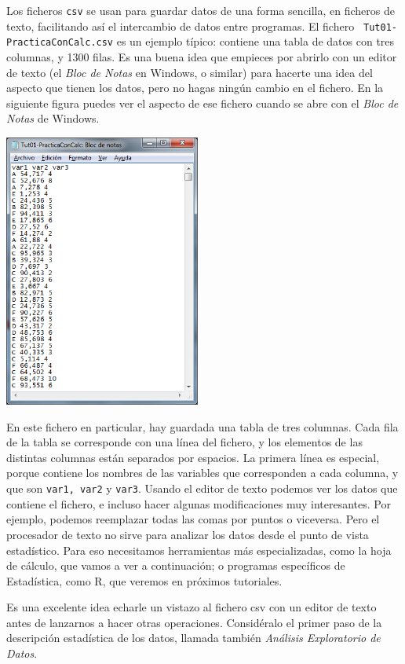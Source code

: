 \documentclass[10pt,a4paper]{article}\usepackage[]{graphicx}\usepackage[]{color}
\newcounter {cont01}
\begin{document}
Los ficheros {\tt csv} se usan para guardar datos de una forma sencilla, en ficheros de texto,
facilitando así el intercambio de datos entre programas. El fichero  {\tt
Tut01-PracticaConCalc.csv} es un ejemplo típico: contiene una tabla de datos con tres columnas, y
1300 filas. Es una buena idea que empieces por abrirlo con un editor de texto (el {\em Bloc de
Notas} en Windows, o similar) para hacerte una idea del aspecto que tienen los datos, pero no hagas
ningún cambio en el fichero. En la siguiente figura puedes ver el aspecto de ese fichero cuando se
abre con el  {\em Bloc de Notas} de Windows.
    \begin{center}
    \includegraphics[height=9cm]{../fig/Tut00-AbriendoFicheroCsvBlocDeNotas.png}
    \end{center}
En este fichero en particular, hay guardada una tabla de tres columnas. Cada fila de la tabla se
corresponde con una línea del fichero, y los elementos de las distintas columnas están separados
por espacios. La primera línea es especial, porque contiene los nombres de las variables que
corresponden a cada columna, y que son {\tt var1, var2} y {\tt var3}. Usando el editor de texto
podemos ver los datos que contiene el fichero, e incluso hacer algunas modificaciones muy
interesantes. Por ejemplo, podemos reemplazar todas las comas por puntos o viceversa. Pero el
procesador de texto no sirve para analizar los datos desde el punto de vista estadístico. Para eso
necesitamos herramientas más especializadas, como la hoja de cálculo, que vamos a ver a
continuación; o programas específicos de Estadística, como R, que veremos en próximos tutoriales.

Es una excelente idea echarle un vistazo al fichero csv con un editor de texto antes de lanzarnos a
hacer otras operaciones. Considéralo el primer paso de la descripción estadística de los datos,
llamada también {\em Análisis Exploratorio de Datos}.
\end{document}
